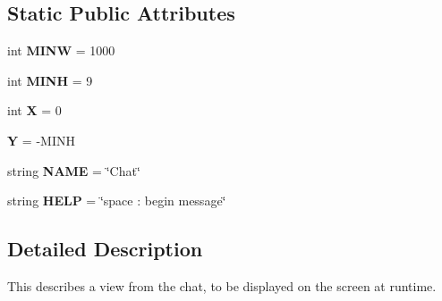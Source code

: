 \subsection*{\-Static \-Public \-Attributes}
\begin{DoxyCompactItemize}
\item 
\hypertarget{classplugins_1_1chatcurses_1_1_chat_view_a1cd296631cf6060c3a3ac9e1c34882e2}{int {\bfseries \-M\-I\-N\-W} = 1000}\label{classplugins_1_1chatcurses_1_1_chat_view_a1cd296631cf6060c3a3ac9e1c34882e2}

\item 
\hypertarget{classplugins_1_1chatcurses_1_1_chat_view_a03159bec7fdc92a2eeab868722ebb841}{int {\bfseries \-M\-I\-N\-H} = 9}\label{classplugins_1_1chatcurses_1_1_chat_view_a03159bec7fdc92a2eeab868722ebb841}

\item 
\hypertarget{classplugins_1_1chatcurses_1_1_chat_view_ab2a1a6d2d6226842c31c1ab5f6df00da}{int {\bfseries \-X} = 0}\label{classplugins_1_1chatcurses_1_1_chat_view_ab2a1a6d2d6226842c31c1ab5f6df00da}

\item 
\hypertarget{classplugins_1_1chatcurses_1_1_chat_view_a711caa8e513889179c4395a3970654cf}{{\bfseries \-Y} = -\/\-M\-I\-N\-H}\label{classplugins_1_1chatcurses_1_1_chat_view_a711caa8e513889179c4395a3970654cf}

\item 
\hypertarget{classplugins_1_1chatcurses_1_1_chat_view_a3d39c317901fd43327f6bfa795ff27e2}{string {\bfseries \-N\-A\-M\-E} = \char`\"{}\-Chat\char`\"{}}\label{classplugins_1_1chatcurses_1_1_chat_view_a3d39c317901fd43327f6bfa795ff27e2}

\item 
\hypertarget{classplugins_1_1chatcurses_1_1_chat_view_aae45f6d26952be89fc2c3924e450c2ee}{string {\bfseries \-H\-E\-L\-P} = \char`\"{}space \-: begin message\char`\"{}}\label{classplugins_1_1chatcurses_1_1_chat_view_aae45f6d26952be89fc2c3924e450c2ee}

\end{DoxyCompactItemize}


\subsection{\-Detailed \-Description}
\begin{DoxyVerb}
This describes a view from the chat, to be displayed on the screen
at runtime.
\end{DoxyVerb}
 

